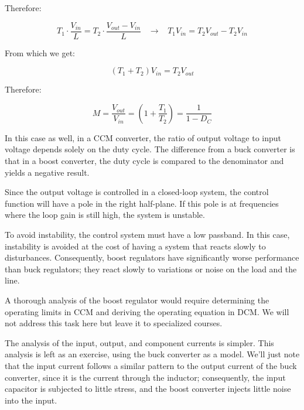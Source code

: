 \documentclass[../main.tex]{subfiles}
\begin{document}
Therefore:

\begin{equation}
	T_1 \cdot \frac{V_{in}}{L} = T_2 \cdot \frac{V_{out} - V_{in}}{L} \hspace{10pt} \longrightarrow \hspace{10pt} T_1V_{in} = T_2V_{out} - T_2V_{in}
\end{equation}

From which we get:

\begin{equation}
	(T_1 + T_2)V_{in} = T_2V_{out}
\end{equation}

Therefore:

\begin{equation}
	M = \frac{V_{out}}{V_{in}} = \left( 1 + \frac{T_1}{T_2} \right) = \frac{1}{1 - D_C}
\end{equation}

In this case as well, in a CCM converter, the ratio of output voltage to input voltage depends solely on the duty cycle. The difference from a buck converter is that in a boost converter, the duty cycle is compared to the denominator and yields a negative result.

Since the output voltage is controlled in a closed-loop system, the control function will have a pole in the right half-plane. If this pole is at frequencies where the loop gain is still high, the system is unstable.

To avoid instability, the control system must have a low passband. In this case, instability is avoided at the cost of having a system that reacts slowly to disturbances. Consequently, boost regulators have significantly worse performance than buck regulators; they react slowly to variations or noise on the load and the line.

A thorough analysis of the boost regulator would require determining the operating limits in CCM and deriving the operating equation in DCM. We will not address this task here but leave it to specialized courses.

The analysis of the input, output, and component currents is simpler. This analysis is left as an exercise, using the buck converter as a model. We’ll just note that the input current follows a similar pattern to the output current of the buck converter, since it is the current through the inductor; consequently, the input capacitor is subjected to little stress, and the boost converter injects little noise into the input.
\end{document}
